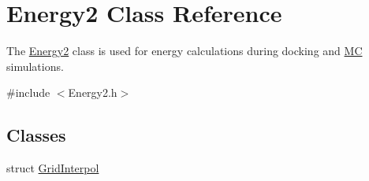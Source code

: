 \hypertarget{classEnergy2}{
\section{Energy2 Class Reference}
\label{classEnergy2}
}


The \hyperlink{classEnergy2}{Energy2} class is used for energy calculations during docking and \hyperlink{classMC}{MC} simulations.  


{\ttfamily \#include $<$Energy2.h$>$}\subsection*{Classes}
\begin{DoxyCompactItemize}
\item 
struct \hyperlink{structEnergy2_1_1GridInterpol}{GridInterpol}
\end{DoxyCompactItemize}
